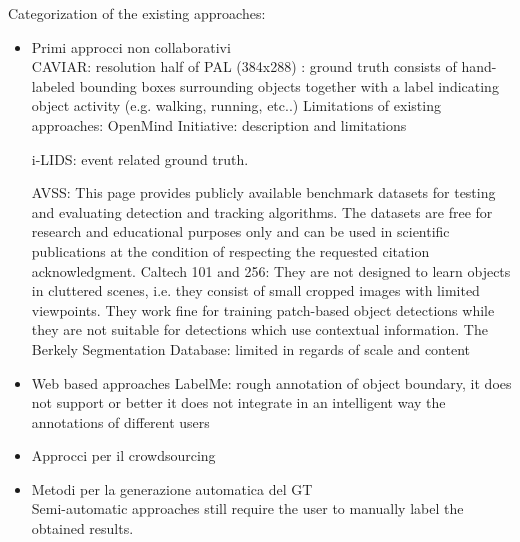 Categorization of the existing approaches: 
\begin{itemize}
\item Primi approcci non collaborativi \\
CAVIAR: resolution half of PAL  (384x288) : ground truth consists of hand-labeled bounding boxes surrounding objects together with a label indicating object activity (e.g. walking, running, etc..)
Limitations of existing approaches:
OpenMind Initiative: description and limitations

 
 i-LIDS: event related ground truth.
 
 
AVSS:  This page provides publicly available benchmark datasets for testing and evaluating detection and tracking algorithms. The datasets are free for research and educational purposes only and can be used in scientific publications at the condition of respecting the requested citation acknowledgment.
Caltech 101 and 256: They are not designed to learn objects in cluttered scenes, i.e. they consist of small cropped images with limited viewpoints. They work fine for training patch-based object detections while they are not suitable for detections which use contextual information.
The Berkely Segmentation Database: limited in regards of scale and content

\item Web based approaches
LabelMe: rough annotation of object boundary, it does not support or better it does not integrate in an intelligent way the annotations of different users

\item Approcci per il crowdsourcing

\item Metodi per la generazione automatica del GT \\
Semi-automatic approaches still require the user to manually label the obtained results.

\end{itemize}




